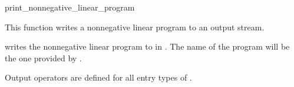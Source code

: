 \begin{ccRefFunction}{print_nonnegative_linear_program}


This function writes a nonnegative linear program to an output stream.

{writes the nonnegative linear program  to  in 
. The name of the program will be the one provided 
by .}

Output operators are defined for all entry types of .

\end{ccRefFunction}
